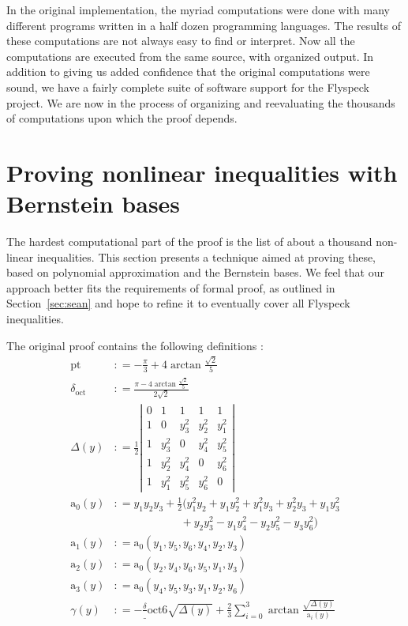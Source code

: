 \documentclass[11pt]{amsart}
\def\coloneq{\mathrel{\mathop:}=}
\def\sfrac#1#2{{\textstyle \frac {#1} {#2}}}
\def\pt{\mathrm{pt}}
\def\doct{\delta_{\mathrm{oct}}}
\def\asolid{\mathrm{a}}
\begin{document}
In the original implementation, the myriad computations were done with
many different programs written in a half dozen programming languages.
The results of these computations are not always easy to find or
interpret.  Now all the computations are executed from the same
source, with organized output.  In addition to giving us added
confidence that the original computations were sound, we have a fairly
complete suite of software support for the Flyspeck project. We are
now in the process of organizing and reevaluating the thousands of
computations upon which the proof depends.

\section{Proving nonlinear inequalities with Bernstein bases}
\label{sec:zumkeller}


The hardest computational part of the proof is the list of about a thousand non-linear inequalities. This section presents a technique aimed at proving
these, based on polynomial approximation and the Bernstein bases. We feel that
our approach better fits the requirements of formal proof, as outlined in
Section~\ref{sec:sean} and hope to refine it to eventually cover all Flyspeck
inequalities.

The original proof contains the following definitions \cite{sp1}:
\begin{align*}
  \pt &\coloneq - \frac \pi 3 + 4 \arctan \frac{\sqrt 2}5 \\
\doct &\coloneq \frac {\pi - 4 \arctan \frac{\sqrt 2}5}{2 \sqrt 2}\\
\Delta(y) &\coloneq \frac 1 2
  \left|
  \begin{array}{ccccc}
0 & 1 & 1 & 1 & 1 \\
   1 & 0 & y_3^2 & y_2^2 & y_1^2 \\
   1 & y_3^2 & 0 & y_4^2 & y_5^2 \\
   1 & y_2^2 & y_4^2 & 0 & y_6^2 \\
   1 & y_1^2 & y_5^2 & y_6^2 & 0
  \end{array}
  \right|\\
\asolid_0(y) &\coloneq y_1 y_2 y_3 + \sfrac 1 2 (
y_1^2 y_2 + y_1 y_2^2 + y_1^2 y_3 + y_2^2 y_3 + y_1 y_3^2 \\
&\qquad\qquad\qquad {} + y_2 y_3^2 - y_1 y_4^2 - y_2 y_5^2 - y_3 y_6^2)\\
\asolid_1(y) &\coloneq \asolid_0 (y_1, y_5, y_6, y_4, y_2, y_3)\\
\asolid_2(y) &\coloneq \asolid_0 (y_2, y_4, y_6, y_5, y_1, y_3)\\
\asolid_3(y) &\coloneq \asolid_0 (y_4, y_5, y_3, y_1, y_2, y_6)\\
\gamma(y) &\coloneq 
- \frac \doct 6 \sqrt {\Delta(y)} + \frac 2 3 \sum_{i=0}^3 \arctan \frac
{\sqrt{\Delta(y)}} {\asolid_i(y)}
\end{align*}
\end{document}
